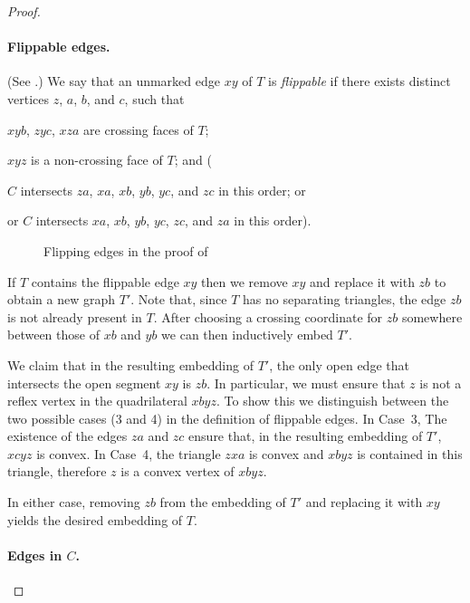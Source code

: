 \documentclass{patmorin}
\begin{document}
\begin{proof}
   \paragraph{Flippable edges.}
   (See .)
   We say that an unmarked edge $xy$ of $T$ is \emph{flippable} if there
   exists distinct vertices $z$, $a$, $b$, and $c$, such that 
   \begin{compactenum}
      \item $xyb$, $zyc$, $xza$ are crossing faces of $T$;
      \item $xyz$ is a non-crossing face of $T$; and (
      \item $C$ intersects $za$, $xa$, $xb$, $yb$, $yc$, and $zc$ in this order; or 
      \item or $C$ intersects $xa$, $xb$, $yb$, $yc$, $zc$, and $za$ in this order).  
   \end{compactenum}
   \begin{figure}
      \caption{Flipping edges in the proof of
      }
   \end{figure}

   If $T$ contains the flippable edge $xy$ then we remove $xy$ and replace
   it with $zb$ to obtain a new graph $T'$.  Note that, since $T$ has
   no separating triangles, the edge $zb$ is not already present in $T$.
   After choosing a crossing coordinate for $zb$ somewhere between those
   of $xb$ and $yb$ we can then inductively embed $T'$.

   We claim that in the resulting embedding of $T'$, the only open edge
   that intersects the open segment $xy$ is $zb$.  In particular, we must
   ensure that $z$ is not a reflex vertex in the quadrilateral $xbyz$.
   To show this we distinguish between the two possible cases (3 and 4)
   in the definition of flippable edges. In Case~3, The existence of the
   edges $za$ and $zc$ ensure that, in the resulting embedding of $T'$,
   $xcyz$ is convex.  In Case~4, the triangle $zxa$ is convex and $xbyz$
   is contained in this triangle, therefore $z$ is a convex vertex
   of $xbyz$.

   In either case, removing $zb$ from the embedding of $T'$ and replacing
   it with $xy$ yields the desired embedding of $T$.

   \paragraph{Edges in $C$.}


\end{proof}
\end{document}
